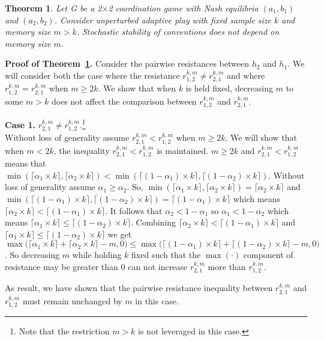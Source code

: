 \documentclass[11.5pt]{article}
\newtheorem{theorem}{Theorem}
\begin{document}
\begin{theorem}\label{Theorem_4}
Let G be a 2$\times$2 coordination game with Nash equilibria $(a_1,b_1)$ and $(a_2,b_2)$. 
Consider unperturbed adaptive play with fixed sample size $k$ and memory size $m > k$. 
Stochastic stability of conventions does not depend on memory size $m$.
\end{theorem}

\textbf{Proof of Theorem~\ref{Theorem_4}.} 
Consider the pairwise resistances between $h_2$ and $h_1$. We will consider both the case where the resistance $r_{1,2}^{k,m} \neq r_{2,1}^{k,m}$ and where $r_{1,2}^{k,m} = r_{2,1}^{k,m}$ when $m \geq 2k$. We show that when $k$ is held fixed, decreasing $m$ to some $m>k$ does not affect the comparison between $r_{1,2}^{k,m}$ and $r_{2,1}^{k,m}$.

{\bf Case 1.} $r^{k,m}_{2,1} \neq r^{k,m}_{1,2}$.\footnote{Note that the restriction $m>k$ is not leveraged in this case.}  \\
Without loss of generality assume $r^{k,m}_{2,1} < r^{k,m}_{1,2}$ when $m \geq 2k$. We will show that when $m < 2k$, the inequality $r^{k,m}_{2,1} < r^{k,m}_{1,2}$ is maintained. $m \geq 2k$ and $r^{k,m}_{2,1} < r^{k,m}_{1,2}$ means that $\min(\lceil \alpha_1 \times k \rceil,\lceil \alpha_2 \times k \rceil) < \min(\lceil (1-\alpha_1) \times k \rceil,\lceil (1-\alpha_2) \times k \rceil)$. Without loss of generality assume $\alpha_1 \geq \alpha_2$. So, $\min(\lceil \alpha_1 \times k \rceil,\lceil \alpha_2 \times k \rceil) = \lceil \alpha_2 \times k \rceil$ and $\min(\lceil (1-\alpha_1) \times k \rceil,\lceil (1-\alpha_2) \times k \rceil) = \lceil (1-\alpha_1) \times k \rceil$ which means $\lceil \alpha_2 \times k \rceil < \lceil (1-\alpha_1) \times k \rceil$. It follows that $\alpha_2< 1- \alpha_1$ so $\alpha_1< 1 - \alpha_2$ which means $\lceil \alpha_1 \times k \rceil \leq \lceil (1 - \alpha_2) \times k \rceil$. Combining $\lceil \alpha_2 \times k \rceil < \lceil (1-\alpha_1) \times k \rceil$ and  $\lceil \alpha_1 \times k \rceil \leq \lceil (1 - \alpha_2) \times k \rceil$ we get $\max\big(\lceil \alpha_1 \times k \rceil+\lceil \alpha_2 \times k \rceil-m,0\big) \leq \max\big(\lceil (1-\alpha_1) \times k \rceil+\lceil (1-\alpha_2) \times k \rceil-m,0\big)$. 
So decreasing $m$ while holding $k$ fixed such that the $\max(\cdot)$ component of resistance may be greater than 0 can not increase $r^{k,m}_{2,1}$ more than $r^{k,m}_{1,2}$. 

As result, we have shown that the pairwise resistance inequality between $r^{k,m}_{2,1}$ and $r^{k,m}_{1,2}$ must remain unchanged by $m$ in this case.
\end{document}
